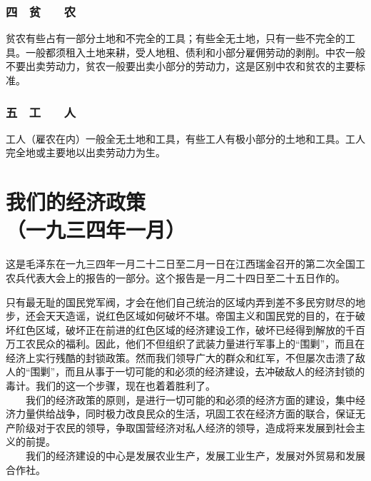 \documentclass[cn,11pt,chinese]{elegantbook}
\def\myformat#1{\hfil\hfil #1}
\begin{document}
\subsubsection*{\myformat{四　贫　　农}}
贫农有些占有一部分土地和不完全的工具；有些全无土地，只有一些不完全的工具。一般都须租入土地来耕，受人地租、债利和小部分雇佣劳动的剥削。中农一般不要出卖劳动力，贫农一般要出卖小部分的劳动力，这是区别中农和贫农的主要标准。\\
\subsubsection*{\myformat{五　工　　人}}
工人（雇农在内）一般全无土地和工具，有些工人有极小部分的土地和工具。工人完全地或主要地以出卖劳动力为生。\\
\newpage\section*{\myformat{我们的经济政策}\\\myformat{（一九三四年一月）}}
\begin{introduction}\item  这是毛泽东在一九三四年一月二十二日至二月一日在江西瑞金召开的第二次全国工农兵代表大会上的报告的一部分。这个报告是一月二十四日至二十五日作的。\end{introduction}
只有最无耻的国民党军阀，才会在他们自己统治的区域内弄到差不多民穷财尽的地步，还会天天造谣，说红色区域如何破坏不堪。帝国主义和国民党的目的，在于破坏红色区域，破坏正在前进的红色区域的经济建设工作，破坏已经得到解放的千百万工农民众的福利。因此，他们不但组织了武装力量进行军事上的“围剿”，而且在经济上实行残酷的封锁政策。然而我们领导广大的群众和红军，不但屡次击溃了敌人的“围剿”，而且从事于一切可能的和必须的经济建设，去冲破敌人的经济封锁的毒计。我们的这一个步骤，现在也着着胜利了。\\
　　我们的经济政策的原则，是进行一切可能的和必须的经济方面的建设，集中经济力量供给战争，同时极力改良民众的生活，巩固工农在经济方面的联合，保证无产阶级对于农民的领导，争取国营经济对私人经济的领导，造成将来发展到社会主义的前提。\\
　　我们的经济建设的中心是发展农业生产，发展工业生产，发展对外贸易和发展合作社。\\
\end{document}
